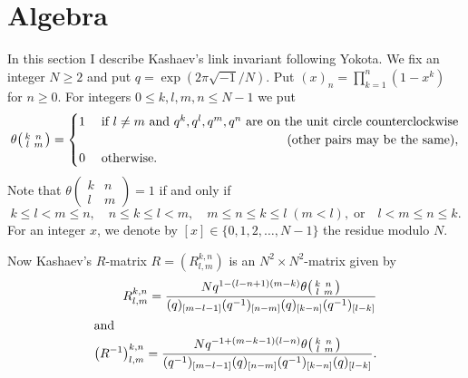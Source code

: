 \documentclass[a4paper]{amsart}
\theoremstyle{plain}
\theoremstyle{definition}
\theoremstyle{remark}
\numberwithin{equation}{section}
\numberwithin{figure}{section}
\begin{document}
\section{Algebra}\label{sec:algebra}
In this section I describe Kashaev's link invariant \cite{Kashaev:MODPLA95}
following Yokota.
We fix an integer $N\ge2$ and put $q=\exp\left(2\pi\sqrt{-1}/N\right)$.
Put $(x)_n=\prod_{k=1}^{n}(1-x^k)$ for $n\ge 0$.
For integers $0{\le}k,l,m,n{\le}N-1$ we put
\begin{equation*}
  \theta\!\left(\begin{smallmatrix} k & n \\ l & m \end{smallmatrix}\right)
  =
  \begin{cases}
    1\;&\text{if ${l}\ne{m}$ and $q^{k},q^{l},q^{m},q^{n}$ are on the unit
    circle counterclockwise}
    \\
    &\hfill\text{(other pairs may be the same)},
    \\
    0\;&\text{otherwise}.
  \end{cases}
\end{equation*}
Note that
$\theta\!\left(\begin{smallmatrix} k & n \\ l & m \end{smallmatrix}\right)=1$
if and only if
\begin{equation*}
  {k}\le{l}<{m}\le{n},\quad
  {n}\le{k}\le{l}<{m},\quad
  {m}\le{n}\le{k}\le{l}\;(m<l),\;\text{or}\quad
  {l}<{m}\le{n}\le{k}.
\end{equation*}
For an integer $x$, we denote by $[x]\in\{0,1,2,\dots,N-1\}$ the residue
modulo $N$.
\par
Now Kashaev's $R$-matrix $R=\left(R_{l,m}^{k,n}\right)$ is an
$N^2\times N^2$-matrix given by
\begin{align*}
  R_{l,m}^{k,n}
  =
  \frac
  {Nq^{1-(l-n+1)(m-k)}
  \theta\!\left(\begin{smallmatrix} k & n \\ l & m \end{smallmatrix}\right)}
  {(q)_{[m-l-1]}(q^{-1})_{[n-m]}(q)_{[k-n]}(q^{-1})_{[l-k]}}
  \\ \intertext{and}
  \left(R^{-1}\right)_{l,m}^{k,n}
  =
  \frac
  {Nq^{-1+(m-k-1)(l-n)}
  \theta\!\left(\begin{smallmatrix} k & n \\ l & m \end{smallmatrix}\right)}
  {(q^{-1})_{[m-l-1]}(q)_{[n-m]}(q^{-1})_{[k-n]}(q)_{[l-k]}}.
\end{align*}
\end{document}

